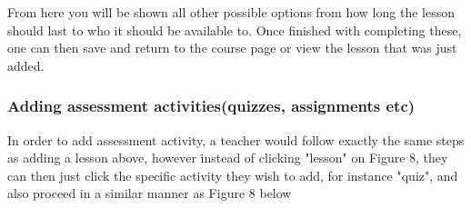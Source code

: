 \documentclass[12pt,a4paper]{article}
\begin{document}
	 
	 		From here you will be shown all other possible options from how long the lesson should last to who it should be available to. Once finished with completing these, one can then save and return to the course page or view the lesson that was just added. 
	 	
	 	\subsubsection{Adding assessment activities(quizzes, assignments etc)}
	 		In order to add assessment activity, a teacher would follow exactly the same steps as adding a lesson above, however instead of clicking "lesson" on Figure 8, they can then just click the specific activity they wish to add, for instance "quiz",  and also proceed in a similar manner as Figure 8 below
		 

 	
 	 
 	 
	
\end{document}
